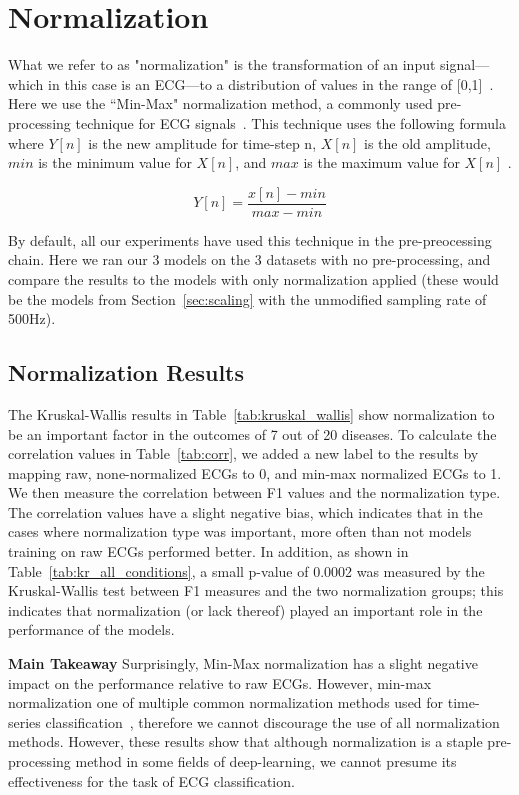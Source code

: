 \documentclass[pmlr,twocolumn]{jmlr}%
\begin{document}
\section{Normalization}
\label{sec:Norm}
What we refer to as "normalization" is the transformation of an input signal---which in this case is an ECG---to a distribution of values in the range of [0,1]~\cite{hong2022practical}. Here we use the ``Min-Max" normalization method, a commonly used pre-processing technique for ECG signals~\cite{uwaechia2021comprehensive,li2010robust,li2019identifying,fang2009human}. This technique uses the following formula where $Y[n]$ is the new amplitude for time-step n, $X[n]$ is the old amplitude, $min$ is the minimum value for $X[n]$, and $max$ is the maximum value for $X[n]$ \cite{uwaechia2021comprehensive}.

\[ Y[n] = \frac{x[n]-min}{max-min} \]

By default, all our experiments have used this technique in the pre-preocessing chain. Here we ran our 3 models on the 3 datasets with no pre-processing, and compare the results to the models with only normalization applied (these would be the models from Section~\ref{sec:scaling} with the unmodified sampling rate of 500Hz). 

\subsection{Normalization Results}
The Kruskal-Wallis results in Table~\ref{tab:kruskal_wallis} show normalization to be an important factor in the outcomes of 7 out of 20 diseases. To calculate the correlation values in Table~\ref{tab:corr}, we added a new label to the results by mapping raw, none-normalized ECGs to 0, and min-max normalized ECGs to 1. We then measure the correlation between F1 values and the normalization type. The correlation values have a slight negative bias, which indicates that in the cases where normalization type was important, more often than not models training on raw ECGs performed better. In addition, as shown in Table~\ref{tab:kr_all_conditions}, a small p-value of 0.0002 was measured by the Kruskal-Wallis test between F1 measures and the two normalization groups; this indicates that normalization (or lack thereof) played an important role in the performance of the models. 

\textbf{Main Takeaway} Surprisingly, Min-Max normalization has a slight negative impact on the performance relative to raw ECGs. However, min-max normalization one
of multiple common normalization methods used for time-series classification~\cite{uwaechia2021comprehensive}, therefore we cannot discourage the use of all normalization methods. However, these results show that although normalization is a staple pre-processing method in some fields of deep-learning, we cannot presume its effectiveness for the task of ECG classification.
\end{document}
